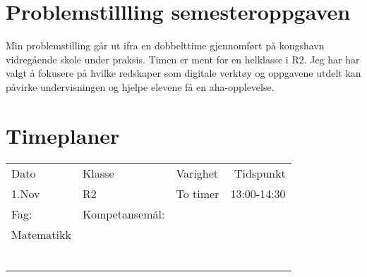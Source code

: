 \documentclass{article}
\date{}
\title{}
\begin{document}
\section*{Problemstillling semesteroppgaven}
\label{sec-1}
Min problemstilling går ut ifra en dobbelttime gjennomført på kongshavn vidregående skole under praksis.
Timen er ment for en helklasse i R2. Jeg har har valgt å fokusere på hvilke redskaper som 
digitale verktøy og oppgavene utdelt kan påvirke undervisningen og hjelpe elevene få en aha-opplevelse.   


\newpage
\section*{Timeplaner}
\label{sec-2}
\begin{center}
\begin{tabular}{l|l|l|r}
Dato & Klasse & Varighet & Tidspunkt\\
1.Nov & R2 & To timer & 13:00-14:30\\
\hline
Fag: & Kompetansemål:\\
Matematikk & \\
 & \\
 & \\
\hline
 &  &  & \\
 &  &  & \\
 &  &  & \\
 &  &  & \\
\end{tabular}
\end{center}
\end{document}
